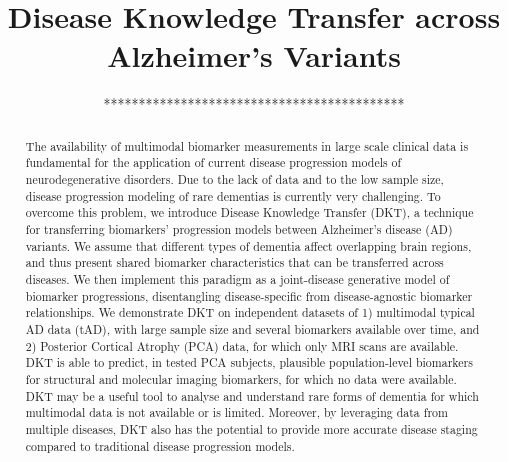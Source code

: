 \documentclass{llncs}
\begin{document}

\title{Disease Knowledge Transfer across Alzheimer's Variants}
%
%

% 
% 

\author{*******************************************}

\institute{***************************************}


\maketitle              %

\begin{abstract}
The availability of multimodal biomarker measurements in large scale clinical data is fundamental for the application of current disease progression models of neurodegenerative disorders. Due to the lack of data and to the low sample size, disease progression modeling of rare dementias is currently very challenging. To overcome this problem, we introduce Disease Knowledge Transfer (DKT), a technique for transferring biomarkers' progression models between Alzheimer's disease (AD) variants. We assume that different types of dementia affect overlapping brain regions, and thus present shared biomarker characteristics that can be transferred across diseases. We then implement this paradigm as a joint-disease generative model of biomarker progressions, disentangling disease-specific from  disease-agnostic biomarker relationships. We demonstrate DKT on independent datasets of 1) multimodal typical AD data (tAD), with large sample size and several biomarkers available over time, and 2) Posterior Cortical Atrophy (PCA) data, for which only MRI scans are available. DKT is able to predict, in tested PCA subjects, plausible population-level biomarkers for structural and molecular imaging biomarkers, for which no data were available. DKT may be a useful tool to analyse and understand rare forms of dementia for which multimodal data is not available or is limited. Moreover, by leveraging data from multiple diseases, DKT also has the potential to provide more accurate disease staging compared to traditional disease progression models.


\end{abstract}
\end{document}
